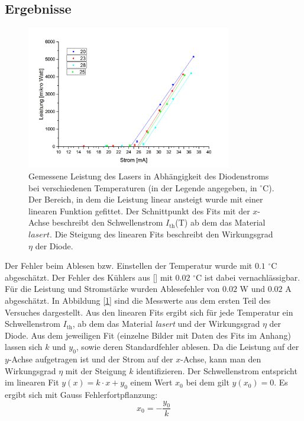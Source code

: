 \documentclass[a4paper,10pt]{scrartcl} %
\begin{document}
\subsection{Ergebnisse}
\label{subsec:Leistung_Ergebnisse}

\begin{figure}
\centering
\includegraphics[width=0.8\textwidth]{Bilder/merged_1.png}
\caption{
Gemessene Leistung des Lasers in Abhängigkeit des Diodenstroms bei verschiedenen Temperaturen (in der Legende angegeben, in $^\circ{\text{C}}$). Der Bereich, in dem die Leistung linear ansteigt wurde mit einer linearen Funktion gefittet. Der Schnittpunkt des Fits mit der $x$-Achse beschreibt den Schwellenstrom $I_{\text{th}}$(T) ab dem das Material $lasert$. Die Steigung des linearen Fits beschreibt den Wirkungsgrad $\eta$ der Diode.
}
\label{fig:1_fits}
\end{figure}
Der Fehler beim Ablesen bzw. Einstellen der Temperatur wurde mit $0.1$ $^\circ{\text{C}}$ abgeschätzt. Der Fehler des Kühlers aus [\cite{Mount}] mit $0.02$ $^\circ{\text{C}}$ ist dabei vernachlässigbar. Für die Leistung und Stromstärke wurden Ablesefehler von $0.02$ W und $0.02$ A abgeschätzt.
In Abbildung [\ref{fig:1_fits}] sind die Messwerte aus dem ersten Teil des Versuches dargestellt. Aus den linearen Fits ergibt sich für jede Temperatur ein Schwellenstrom $I_{\text{th}}$, ab dem das Material \emph{lasert} und der Wirkungsgrad $\eta$ der Diode. Aus dem jeweiligen Fit (einzelne Bilder mit Daten des Fits im Anhang) lassen sich $k$ und $y_0$, sowie deren Standardfehler ablesen. Da die Leistung auf der $y$-Achse aufgetragen ist und der Strom auf der $x$-Achse, kann man den Wirkungsgrad $\eta$ mit der Steigung $k$ identifizieren. Der Schwellenstrom entspricht im linearen Fit $y(x) = k\cdot x + y_0$ einem Wert $x_0$ bei dem gilt $y(x_0) = 0$. Es ergibt sich mit Gauss Fehlerfortpflanzung:
\begin{equation}
x_0 = -\frac{y_0}{k}
\end{equation}
\end{document}
